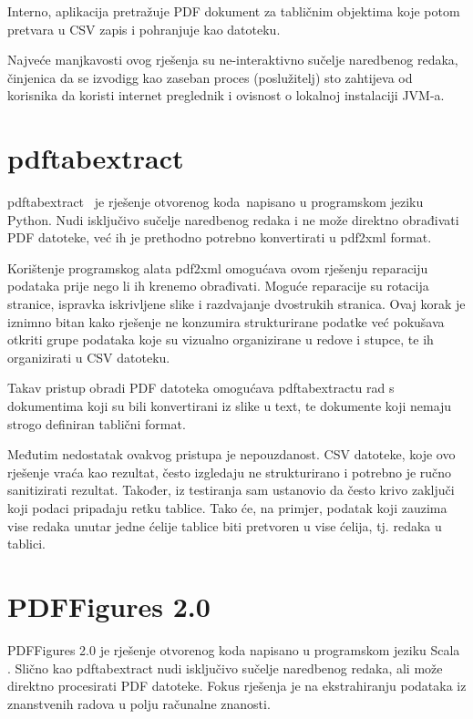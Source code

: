 \documentclass[times, utf8, zavrsni]{fer}
\begin{document}
Interno, aplikacija pretražuje PDF dokument za tabličnim objektima koje potom
pretvara u CSV zapis i pohranjuje kao datoteku.

Najveće manjkavosti ovog rješenja su ne-interaktivno sučelje naredbenog redaka,
činjenica da se izvodigg kao zaseban proces (poslužitelj) sto zahtijeva od
korisnika
da koristi internet preglednik i ovisnost o lokalnoj instalaciji JVM-a.

\section{pdftabextract}

pdftabextract \cite{pdftabextract_repository} je rješenje otvorenog koda napisano
u programskom jeziku Python.
Nudi isključivo sučelje naredbenog redaka i ne može direktno obrađivati PDF
datoteke, već ih je prethodno potrebno konvertirati u pdf2xml format.

Korištenje programskog alata pdf2xml omogućava ovom rješenju reparaciju
podataka prije nego li ih krenemo obrađivati. Moguće reparacije su rotacija
stranice, ispravka iskrivljene slike i razdvajanje dvostrukih stranica. Ovaj
korak je iznimno bitan kako rješenje ne konzumira strukturirane podatke već
pokušava otkriti grupe podataka koje su vizualno organizirane u redove i
stupce, te ih organizirati u CSV datoteku.

Takav pristup obradi PDF datoteka omogućava pdftabextractu rad s dokumentima
koji su bili konvertirani iz slike u text, te dokumente koji nemaju strogo
definiran tablični format.

Međutim nedostatak ovakvog pristupa je nepouzdanost.
CSV datoteke, koje ovo rješenje vraća kao rezultat, često izgledaju ne
strukturirano i potrebno je ručno sanitizirati rezultat. Također, iz testiranja
sam ustanovio da često krivo zaključi koji podaci pripadaju retku tablice.
Tako će, na primjer, podatak koji zauzima vise redaka unutar jedne ćelije
tablice biti pretvoren u vise ćelija, tj. redaka u tablici.

\section{PDFFigures 2.0}

PDFFigures 2.0 \cite{pdffigures_2_repository} je rješenje otvorenog koda
napisano u programskom jeziku Scala \cite{scala_documentation}. Slično kao
pdftabextract nudi isključivo
sučelje naredbenog redaka, ali može direktno procesirati PDF datoteke. Fokus
rješenja je na ekstrahiranju podataka iz znanstvenih radova u polju računalne
znanosti.
\end{document}
